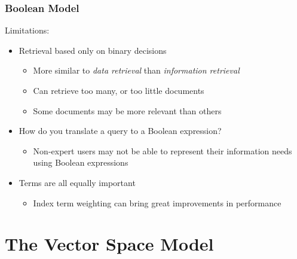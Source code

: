 \documentclass[svgnames]{beamer}
\begin{document}


\begin{frame}

  \frametitle{Boolean Model}

%

  \begin{block}{Limitations:}
    \begin{itemize}
    \item Retrieval based only on binary decisions
      \begin{itemize}
      \item More similar to \textit{data retrieval} than \textit{information
          retrieval}
      \item Can retrieve too many, or too little documents
      \item Some documents may be more relevant than others
      \end{itemize}
    \item How do you translate a query to a Boolean expression?
      \begin{itemize}
      \item Non-expert users may not be able to represent their information
        needs using Boolean expressions
      \end{itemize}
    \item Terms are all equally important
      \begin{itemize}
      \item Index term weighting can bring great improvements in performance
      \end{itemize}
    \end{itemize}
  \end{block}
\end{frame}



\section{The Vector Space Model}
\label{sec:vector}
\end{document}
